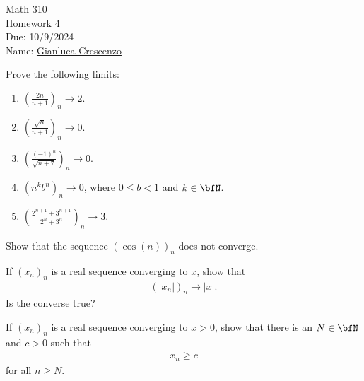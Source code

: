 \documentclass[10pt,twoside,openany]{memoir}
\begin{document}
\begin{center}
    { \Large Math 310 \\[0.1in]Homework 4 \\[0.1in]
    Due: 10/9/2024}\\[.25in]
    { Name:} {\underline{Gianluca Crescenzo\hspace*{2in}}}\\[0.15in]
    \end{center}
    \vspace{4pt}
    \begin{exercise}
        Prove the following limits:
            \begin{enumerate}[label = (\arabic*)]
                \item $\left(\frac{2n}{n+1}\right)_n \rightarrow 2$.
                \item $\left(\frac{\sqrt{n}}{n+1}\right)_n \rightarrow 0$.
                \item $\left(\frac{(-1)^n}{\sqrt{n+7}}\right)_n \rightarrow 0$.
                \item $(n^k b^n)_n \rightarrow 0$, where $0 \leq b < 1$ and $k \in \bfN$.
                \item $\left(\frac{2^{n+1}+3^{n+1}}{2^n + 3^n}\right)_n \rightarrow 3$.
            \end{enumerate}
    \end{exercise}

    \begin{exercise}
        Show that the sequence $(\cos(n))_n$ does not converge.
    \end{exercise}

    \begin{exercise}
        If $(x_n)_n$ is a real sequence converging to $x$, show that 
            \begin{equation*}
            \begin{split}
                (|x_n|)_n \rightarrow |x|.
            \end{split}
            \end{equation*}
        Is the converse true?
    \end{exercise}

    \begin{exercise}
        If $(x_n)_n$ is a real sequence converging to $x>0$, show that there is an $N \in \bfN$ and $c>0$ such that
            \begin{equation*}
            \begin{split}
                x_n \geq c
            \end{split}
            \end{equation*}
        for all $n \geq N$.
    \end{exercise}
\end{document}
